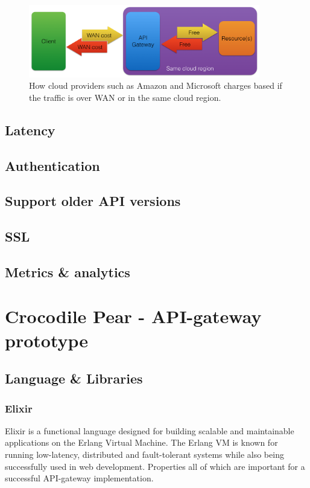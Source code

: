 \documentclass{cslthse-msc}
\begin{document}
\begin{figure}[H]
  \centering
    \begin{center}
      \includegraphics[width=0.9\textwidth]{images/api_gateway_bandwidth.png}
    \end{center}
  \caption{How cloud providers such as Amazon\cite{cloud_amazon} and Microsoft\cite{cloud_microsoft} charges based if the traffic is over WAN or in the same cloud region.}
\end{figure}

\section{Latency}

\section{Authentication}

\section{Support older API versions}

\section{SSL}

\section{Metrics \& analytics}

\chapter{Crocodile Pear - API-gateway prototype}

\section{Language \& Libraries}
\subsection{Elixir}
Elixir is a functional language designed for building scalable and maintainable applications on the Erlang Virtual Machine. The Erlang VM is known for running low-latency, distributed and fault-tolerant systems while also being successfully used in web development\cite{elixir}. Properties all of which are important for a successful API-gateway implementation.
\end{document}
